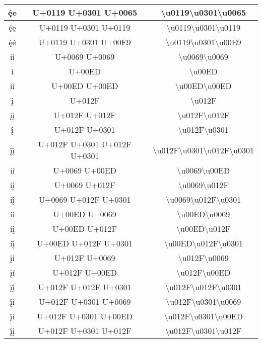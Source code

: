 \begin{longtable}{|c|c|c|}
ę́e & U+0119 U+0301 U+0065 & \textbackslash{}u0119\textbackslash{}u0301\textbackslash{}u0065 \\ \hline
ę́ę & U+0119 U+0301 U+0119 & \textbackslash{}u0119\textbackslash{}u0301\textbackslash{}u0119 \\ \hline
ę́é & U+0119 U+0301 U+00E9  & \textbackslash{}u0119\textbackslash{}u0301\textbackslash{}u00E9 \\ \hline

ii & U+0069 U+0069  & \textbackslash{}u0069\textbackslash{}u0069 \\ \hline
í & U+00ED & \textbackslash{}u00ED \\ \hline
íí & U+00ED U+00ED & \textbackslash{}u00ED\textbackslash{}u00ED \\ \hline
į & U+012F & \textbackslash{}u012F \\ \hline
įį & U+012F U+012F & \textbackslash{}u012F\textbackslash{}u012F \\ \hline
į́ & U+012F U+0301 & \textbackslash{}u012F\textbackslash{}u0301 \\ \hline
į́į́ & U+012F U+0301 U+012F U+0301 & \textbackslash{}u012F\textbackslash{}u0301\textbackslash{}u012F\textbackslash{}u0301 \\ \hline

ií & U+0069 U+00ED & \textbackslash{}u0069\textbackslash{}u00ED \\ \hline
iį & U+0069 U+012F & \textbackslash{}u0069\textbackslash{}u012F \\ \hline
iį́ & U+0069 U+012F U+0301 & \textbackslash{}u0069\textbackslash{}u012F\textbackslash{}u0301 \\ \hline

íi & U+00ED U+0069 & \textbackslash{}u00ED\textbackslash{}u0069 \\ \hline
íį & U+00ED U+012F  & \textbackslash{}u00ED\textbackslash{}u012F \\ \hline
íį́ & U+00ED U+012F U+0301 & \textbackslash{}u00ED\textbackslash{}u012F\textbackslash{}u0301 \\ \hline

įi & U+012F U+0069 & \textbackslash{}u012F\textbackslash{}u0069 \\ \hline
įí & U+012F U+00ED & \textbackslash{}u012F\textbackslash{}u00ED \\ \hline
įį́ & U+012F U+012F U+0301 & \textbackslash{}u012F\textbackslash{}u012F\textbackslash{}u0301 \\ \hline

į́i & U+012F U+0301 U+0069 & \textbackslash{}u012F\textbackslash{}u0301\textbackslash{}u0069 \\ \hline
į́í & U+012F U+0301 U+00ED & \textbackslash{}u012F\textbackslash{}u0301\textbackslash{}u00ED \\ \hline
į́į & U+012F U+0301 U+012F & \textbackslash{}u012F\textbackslash{}u0301\textbackslash{}u012F \\ \hline


\end{longtable}
